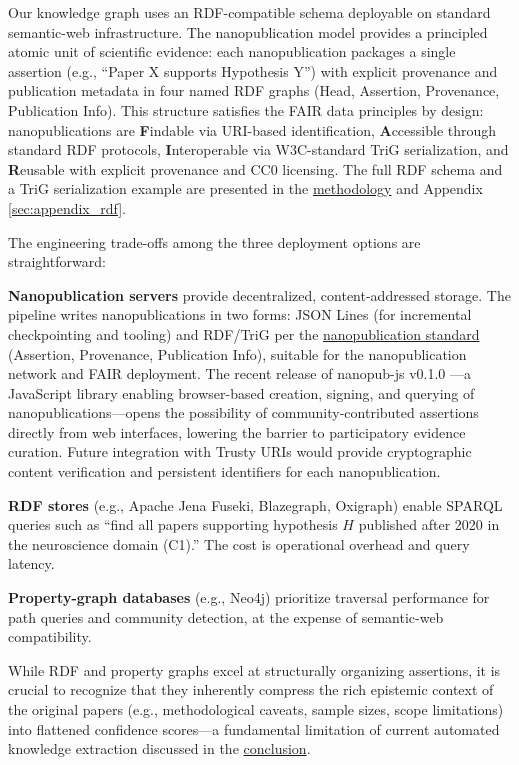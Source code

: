 \documentclass[
  english,
]{article}
\begin{document}
Our knowledge graph uses an RDF-compatible schema deployable on standard
semantic-web infrastructure. The nanopublication model
\citep{groth2010anatomy, kuhn2016decentralized} provides a principled
atomic unit of scientific evidence: each nanopublication packages a
single assertion (e.g., ``Paper X supports Hypothesis Y'') with explicit
provenance and publication metadata in four named RDF graphs (Head,
Assertion, Provenance, Publication Info). This structure satisfies the
FAIR data principles by design: nanopublications are \textbf{F}indable
via URI-based identification, \textbf{A}ccessible through standard RDF
protocols, \textbf{I}nteroperable via W3C-standard TriG serialization,
and \textbf{R}eusable with explicit provenance and CC0 licensing. The
full RDF schema and a TriG serialization example are presented in the
\hyperref[sec:methods_kg]{methodology} and Appendix
\ref{sec:appendix_rdf}.

The engineering trade-offs among the three deployment options are
straightforward:

\textbf{Nanopublication servers} provide decentralized,
content-addressed storage. The pipeline writes nanopublications in two
forms: JSON Lines (for incremental checkpointing and tooling) and
RDF/TriG per the \href{https://nanopub.net/}{nanopublication standard}
(Assertion, Provenance, Publication Info), suitable for the
nanopublication network and FAIR deployment. The recent release of
nanopub-js v0.1.0 \citep{kuhn2026nanopubjs}---a JavaScript library
enabling browser-based creation, signing, and querying of
nanopublications---opens the possibility of community-contributed
assertions directly from web interfaces, lowering the barrier to
participatory evidence curation. Future integration with Trusty URIs
\citep{kuhn2014trusty} would provide cryptographic content verification
and persistent identifiers for each nanopublication.

\textbf{RDF stores} (e.g., Apache Jena Fuseki, Blazegraph, Oxigraph)
enable SPARQL queries such as ``find all papers supporting hypothesis
\(H\) published after 2020 in the neuroscience domain (C1).'' The cost
is operational overhead and query latency.

\textbf{Property-graph databases} (e.g., Neo4j) prioritize traversal
performance for path queries and community detection, at the expense of
semantic-web compatibility.

While RDF and property graphs excel at structurally organizing
assertions, it is crucial to recognize that they inherently compress the
rich epistemic context of the original papers (e.g., methodological
caveats, sample sizes, scope limitations) into flattened confidence
scores---a fundamental limitation of current automated knowledge
extraction discussed in the \hyperref[sec:conclusion]{conclusion}.
\end{document}
